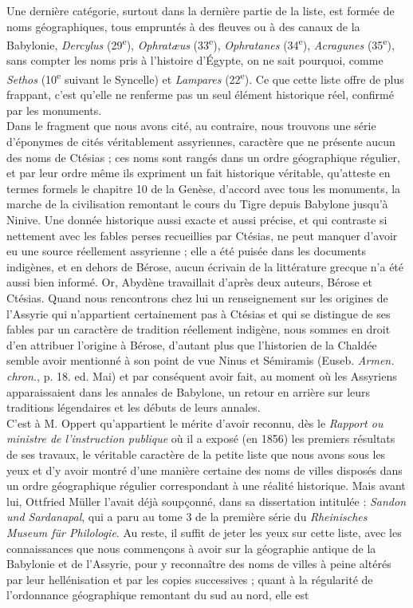 \documentclass[a4paper, 11pt, oneside]{article}
\begin{document}
Une dernière catégorie, surtout dans la dernière partie de la liste, est formée de noms géographiques, tous empruntés à des fleuves ou à des canaux de la Babylonie, \emph{Dercylus} (29\textsuperscript{e}), \emph{Ophratæus} (33\textsuperscript{e}), \emph{Ophratanes} (34\textsuperscript{e}), \emph{Acragunes} (35\textsuperscript{e}), sans compter les noms pris à l'histoire d'Égypte, on ne sait pourquoi, comme \emph{Sethos} (10\textsuperscript{e} suivant le Syncelle) et \emph{Lampares} (22\textsuperscript{e}). Ce que cette liste offre de plus frappant, c'est qu'elle ne renferme pas un seul élément historique réel, confirmé par les monuments.\\\hspace*{5mm}Dans le fragment que nous avons cité, au contraire, nous trouvons une série d'éponymes de cités véritablement assyriennes, caractère que ne présente aucun des noms de Ctésias ; ces noms sont rangés dans un ordre géographique régulier, et par leur ordre même ils expriment un fait historique véritable, qu'atteste en termes formels le chapitre 10 de la Genèse, d'accord avec tous les monuments, la marche de la civilisation remontant le cours du Tigre depuis Babylone jusqu'à Ninive. Une donnée historique aussi exacte et aussi précise, et qui contraste si nettement avec les fables perses recueillies par Ctésias, ne peut manquer d'avoir eu une source réellement assyrienne ; elle a été puisée dans les documents indigènes, et en dehors de Bérose, aucun écrivain de la littérature grecque n'a été aussi bien informé. Or, Abydène travaillait d'après deux auteurs, Bérose et Ctésias. Quand nous rencontrons chez lui un renseignement sur les origines de l'Assyrie qui n'appartient certainement pas à Ctésias et qui se distingue de ses fables par un caractère de tradition réellement indigène, nous sommes en droit d'en attribuer l'origine à Bérose, d'autant plus que l'historien de la Chaldée semble avoir mentionné à son point de vue Ninus et Sémiramis (Euseb. \emph{Armen. chron.}, p. 18. ed. Mai) et par conséquent avoir fait, au moment où les Assyriens apparaissaient dans les annales de Babylone, un retour en arrière sur leurs traditions légendaires et les débuts de leurs annales.\\\hspace*{5mm}C'est à M. Oppert qu'appartient le mérite d'avoir reconnu, dès le \emph{Rapport ou ministre de l'instruction publique} où il a exposé (en 1856) les premiers résultats de ses travaux, le véritable caractère de la petite liste que nous avons sous les yeux et d'y avoir montré d'une manière certaine des noms de villes disposés dans un ordre géographique régulier correspondant à une réalité historique. Mais avant lui, Ottfried Müller l'avait déjà soupçonné, dans sa dissertation intitulée : \emph{Sandon und Sardanapal}, qui a paru au tome 3 de la première série du \emph{Rheinisches Museum für Philologie}. Au reste, il suffit de jeter les yeux sur cette liste, avec les connaissances que nous commençons à avoir sur la géographie antique de la Babylonie et de l'Assyrie, pour y reconnaître des noms de villes à peine altérés par leur hellénisation et par les copies successives ; quant à la régularité de l'ordonnance géographique remontant du sud au nord, elle est 
\end{document}
